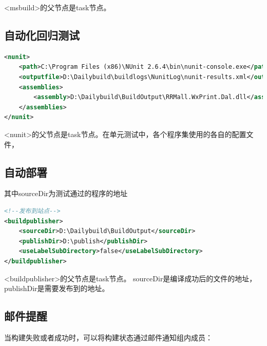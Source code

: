 \documentclass{book}
\begin{document}
<msbuild>的父节点是task节点。

\subsection{自动化回归测试}

\begin{lstlisting}[language=XML]
<nunit> 
	<path>C:\Program Files (x86)\NUnit 2.6.4\bin\nunit-console.exe</path>          
	<outputfile>D:\Dailybuild\buildlogs\NunitLog\nunit-results.xml</outputfile> 
	<assemblies> 
		<assembly>D:\Dailybuild\BuildOutput\RRMall.WxPrint.Dal.dll</assembly> 
	</assemblies> 
</nunit>
\end{lstlisting}

<nunit>的父节点是task节点。在单元测试中，各个程序集使用的各自的配置文件，


\subsection{自动部署}

其中sourceDir为测试通过的程序的地址

\begin{lstlisting}[language=XML]
<!--发布到站点-->
<buildpublisher>
	<sourceDir>D:\Dailybuild\BuildOutput</sourceDir>
	<publishDir>D:\publish</publishDir>
	<useLabelSubDirectory>false</useLabelSubDirectory>
</buildpublisher>
\end{lstlisting}

<buildpublisher>的父节点是task节点。
sourceDir是编译成功后的文件的地址，
publishDir是需要发布到的地址。

\subsection{邮件提醒}

当构建失败或者成功时，可以将构建状态通过邮件通知组内成员：
\end{document}
